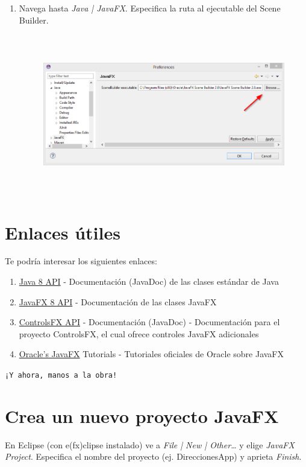\begin{enumerate}
\begin{figure}[H]
	\end{figure}
	\item Navega hasta \textit{Java | JavaFX}. Especifica la ruta al ejecutable del Scene Builder.
	\begin{figure}[H]
		\includegraphics[height=7cm]{img/preferences-javafx}
	\end{figure}
	
\end{enumerate}


\section{Enlaces útiles}
Te podría interesar los siguientes enlaces:
\begin{enumerate}
	\item \textcolor{azul}{\href{https://docs.oracle.com/javase/8/docs/api/}{Java 8 API}} - Documentación (JavaDoc) de las clases estándar de Java
	\item \textcolor{azul}{\href{https://docs.oracle.com/javase/8/javafx/api/}{JavaFX 8 API}} - Documentación de las clases JavaFX
	\item  \textcolor{azul}{\href{https://controlsfx.bitbucket.io/}{ControlsFX API}} - Documentación (JavaDoc) - Documentación para el proyecto ControlsFX, el cual ofrece controles JavaFX adicionales
	\item \textcolor{azul}{\href{https://docs.oracle.com/javase/8/javafx/get-started-tutorial/get_start_apps.htm}{Oracle’s JavaFX}} Tutorials - Tutoriales oficiales de Oracle sobre JavaFX
\end{enumerate}
\texttt{¡Y ahora, manos a la obra!}

\section{Crea un nuevo proyecto JavaFX}
En Eclipse (con e(fx)clipse instalado) ve a \textit{File | New | Other…} y elige \textit{JavaFX Project}. Especifica el nombre del proyecto (ej. DireccionesApp) y aprieta \textit{Finish}.\\

